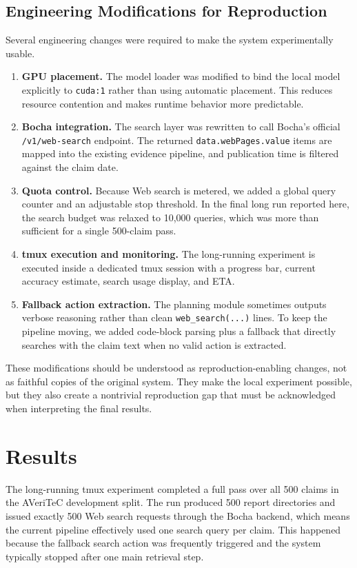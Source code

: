 \documentclass[11pt]{article}
\begin{document}
\subsection*{Engineering Modifications for Reproduction}
Several engineering changes were required to make the system experimentally usable.

\begin{enumerate}[leftmargin=*]
\item \textbf{GPU placement.} The model loader was modified to bind the local model explicitly to \texttt{cuda:1} rather than using automatic placement. This reduces resource contention and makes runtime behavior more predictable.
\item \textbf{Bocha integration.} The search layer was rewritten to call Bocha's official \texttt{/v1/web-search} endpoint. The returned \texttt{data.webPages.value} items are mapped into the existing evidence pipeline, and publication time is filtered against the claim date.
\item \textbf{Quota control.} Because Web search is metered, we added a global query counter and an adjustable stop threshold. In the final long run reported here, the search budget was relaxed to 10,000 queries, which was more than sufficient for a single 500-claim pass.
\item \textbf{tmux execution and monitoring.} The long-running experiment is executed inside a dedicated tmux session with a progress bar, current accuracy estimate, search usage display, and ETA.
\item \textbf{Fallback action extraction.} The planning module sometimes outputs verbose reasoning rather than clean \texttt{web\_search(...)} lines. To keep the pipeline moving, we added code-block parsing plus a fallback that directly searches with the claim text when no valid action is extracted.
\end{enumerate}

These modifications should be understood as reproduction-enabling changes, not as faithful copies of the original system. They make the local experiment possible, but they also create a nontrivial reproduction gap that must be acknowledged when interpreting the final results.

\section*{Results}
The long-running tmux experiment completed a full pass over all 500 claims in the AVeriTeC development split. The run produced 500 report directories and issued exactly 500 Web search requests through the Bocha backend, which means the current pipeline effectively used one search query per claim. This happened because the fallback search action was frequently triggered and the system typically stopped after one main retrieval step.
\end{document}

